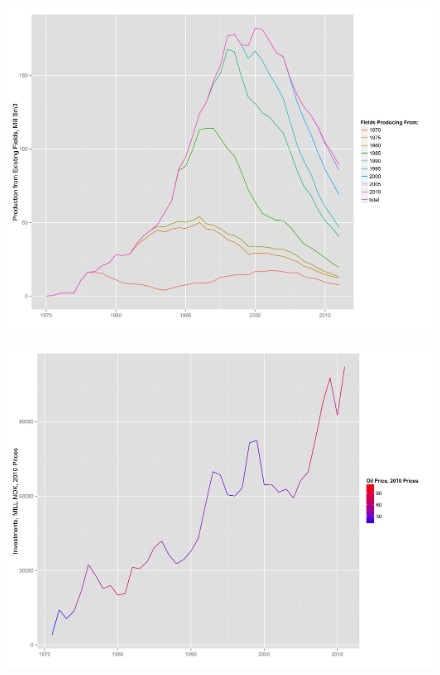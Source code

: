 \documentclass{beamer}
\begin{document}

\begin{frame}[plain]
	\begin{figure}
	\includegraphics[width=1\textwidth]{tot_exist_prod_cf.png}
	\end{figure}
\end{frame}



\begin{frame}[plain]
	\begin{figure}
	\includegraphics[width=1\textwidth]{invest_with_oil_price.png}
	\end{figure}
\end{frame}
\end{document}
